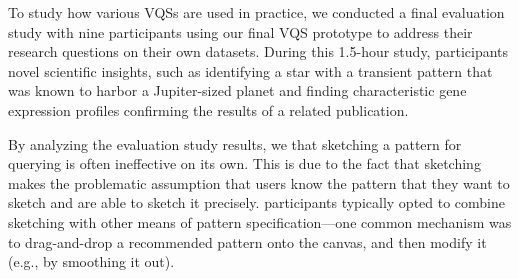 \par To study how various VQSs are used in practice, we conducted a final evaluation study with nine participants using our final VQS prototype to address their research questions on their own datasets. During this 1.5-hour study, participants  novel scientific insights,
 such as identifying a star with a transient pattern that was known to harbor a Jupiter-sized planet and finding characteristic gene expression profiles confirming the results of a related publication. %
 \par By analyzing the evaluation study results, we  that sketching a pattern for querying is often ineffective on its own. This is due to the fact that sketching makes the problematic assumption that users know the pattern that they want to sketch and are able to sketch it precisely. participants typically opted to combine sketching with other means of pattern specification---one common mechanism was to drag-and-drop a recommended pattern onto the canvas, and then modify it (e.g., by smoothing it out). %
